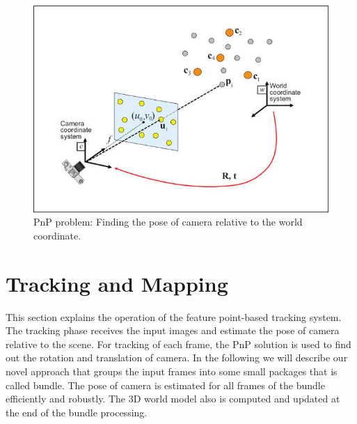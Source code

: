 \begin{figure}[H]
  \centering
  \includegraphics[width=140mm]{figures/pnp}
  \caption{PnP problem: Finding the pose of camera relative to the world coordinate.} \label{fig:pnp_sample}
\end{figure}


\section{Tracking and Mapping}
This section explains the operation of the feature point-based tracking system. The tracking phase receives the input images and estimate the pose of camera relative to the scene. For tracking of each frame, the PnP solution is used to find out the rotation and translation of camera. In the following we will describe our novel approach that groups the input frames into some small packages that is called bundle. The pose of camera is estimated for all frames of the bundle efficiently and robustly. The 3D world model also is computed and updated at the end of the bundle processing.

